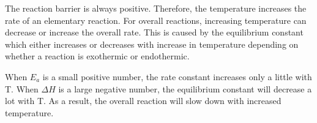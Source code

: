 \documentclass{article}
\begin{document}
The reaction barrier is always positive. Therefore, the temperature increases
the rate of an elementary reaction. For overall reactions, increasing
temperature can decrease or increase the overall rate. This is caused by the
equilibrium constant which either increases or decreases with increase in
temperature depending on whether a reaction is exothermic or endothermic.

When $E_{a}$ is a small positive number, the rate constant increases only a
little with T. When $\Delta H$ is a large negative number, the equilibrium
constant will decrease a lot with T. As a result, the overall reaction will slow
down with increased temperature.
\end{document}

